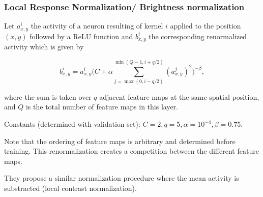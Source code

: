 \begin{frame}
	\frametitle{Local Response Normalization/ Brightness normalization}
	
	

	Let $a_{x,y}^i$ the activity of a neuron resulting of kernel $i$ applied to the position $(x,y)$ followed by a ReLU function and $b_{x,y}^i$ the corresponding renormalized activity which is given by
	
	$$
	b_{x,y}^i = a_{x,y}^i \Bigg( C + \alpha \sum_{j = \max(0, i - q/2)}^{\min(Q-1, i + q/2)} (a_{x,y}^j )^2 \Bigg)^{-\beta},
	$$
	
	\smallskip
	
	where the sum is taken over $q$ adjacent feature maps at the same spatial position, and $Q$ is the total number of feature maps in this layer. 
	
	\smallskip
	
	Constants (determined with validation set): $C=2, q=5, \alpha = 10^{-4}, \beta = 0.75$.
	
	\bigskip 
	
	Note that the ordering of feature maps is arbitrary and determined before training. This renormalization creates a competition between the different feature maps. 
	
	\bigskip
	
	\smallskip 
	
	They propose a similar normalization procedure where the mean activity is substracted (local contrast normalization).
	
\end{frame}

